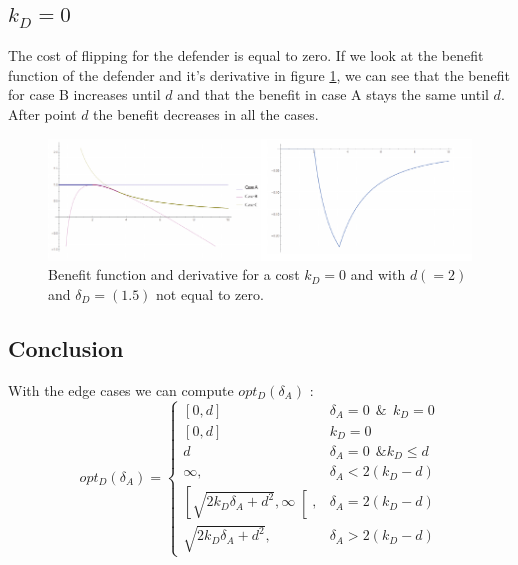 \subsection*{$k_{D}=0$}
The cost of flipping for the defender is equal to zero. If we look at the benefit function of the defender and it's derivative in figure \ref{cost0}, we can see that the benefit for case B increases until $d$ and that the benefit in case A stays the same until $d$. After point $d$ the benefit decreases in all the cases. 

\begin{figure}[hbtp]
\centering
\includegraphics[scale=1]{Images/cost0.pdf} 
\caption{Benefit function and derivative for a cost $k_{D} = 0$ and with $d (=2)$ and $\delta_{D}=(1.5)$ not equal to zero.}
\label{cost0}
\end{figure}




\subsection{Conclusion}
With the edge cases we can compute $opt_{D}(\delta_{A})$ : \\

 \begin{displaymath}
  opt_{D}(\delta_{A}) = \left\{
     \begin{array}{lr}
     \left[0,d\right] & \delta_{A} =0 ~~\& ~~k_{D}=0 \\
     \left[0,d\right] & k_{D}=0\\
     d & \delta_{A} =0 ~~ \& k_{D} \leq d\\
          \infty , & \delta_{A} < 2(k_{D} - d)\\
      \left[ \sqrt{2k_{D}\delta_{A} + d^{2}},\infty\right[ , & \delta_{A} = 2(k_{D} - d) \\
      \sqrt{2k_{D}\delta_{A} + d^{2}}, & \delta_{A} > 2(k_{D} - d)
     \end{array}
   \right.
\end{displaymath}
%
%
